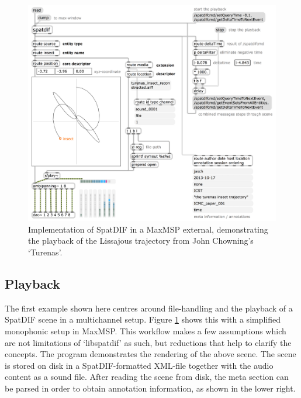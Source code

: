 \documentclass{article}
\begin{document}
\begin{figure}[!ht]
	\centering
	\includegraphics[width=\columnwidth]{playback_maxpatch.png}
	\caption{Implementation of SpatDIF in a MaxMSP external, demonstrating the playback of the Lissajous trajectory from John Chowning's `Turenas'.} 
	\label{fig:screenshot}
\end{figure}

\subsection{Playback}\label{subsec:playback}

The first example shown here centres around file-handling and the playback of a SpatDIF scene in a multichannel setup.
Figure \ref{fig:screenshot} shows this with a simplified monophonic setup in MaxMSP.
This workflow makes a few assumptions which are not limitations of `libspatdif' as such, but reductions that help to clarify the concepts.
The program demonstrates the rendering of the above scene.
The scene is stored on disk in a SpatDIF-formatted XML-file together with the audio content as a sound file.
After reading the scene from disk, the meta section can be parsed in order to obtain annotation information, as shown in the lower right.
\end{document}

